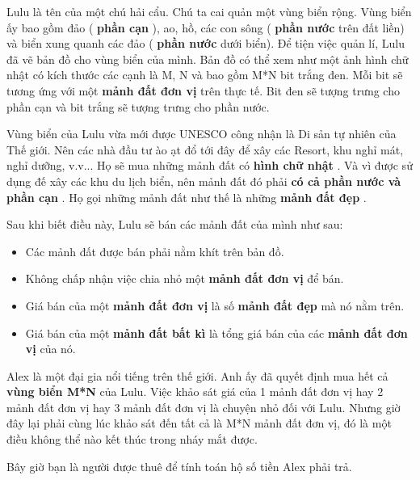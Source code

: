 



   Lulu là tên của một chú hải cẩu. Chú ta cai quản một vùng biển rộng. Vùng biển ấy bao gồm đảo (   \textbf{    phần cạn   }   ), ao, hồ, các con sông (   \textbf{    phần nước   }   trên đất liền) và biển xung quanh các đảo (   \textbf{    phần nước   }   dưới biển). Để tiện việc quản lí, Lulu đã vẽ bản đồ cho vùng biển của mình. Bản đồ có thể xem như một ảnh hình chữ nhật có kích thước các cạnh là M, N và bao gồm M*N bit trắng đen. Mỗi bit sẽ tương ứng với một   \textbf{    mảnh đất đơn vị   }   trên thực tế. Bit đen sẽ tượng trưng cho phần cạn và bit trắng sẽ tượng trưng cho phần nước.  

   Vùng biển của Lulu vừa mới được UNESCO công nhận là Di sản tự nhiên của Thế giới. Nên các nhà đầu tư ào ạt đổ tới đây để xây các Resort, khu nghỉ mát, nghỉ dưỡng, v.v... Họ sẽ mua những mảnh đất có   \textbf{    hình chữ nhật   }   . Và vì được sử dụng đế xây các khu du lịch biển, nên mảnh đất đó phải   \textbf{    có cả phần nước và phần cạn   }   . Họ gọi những mảnh đất như thế là   \textbf{}   những   \textbf{    mảnh đất đẹp   }   .  

   Sau khi biết điều này, Lulu sẽ bán các mảnh đất của mình như sau:  
\begin{itemize}
	\item     Các mảnh đất được bán phải nằm    khít    trên bản đồ.   
	\item     Không chấp nhận việc chia nhỏ một    \textbf{     mảnh đất đơn vị    }    để bán.   
	\item     Giá bán của một    \textbf{     mảnh đất đơn vị    }    là số    \textbf{     mảnh đất đẹp    }    mà nó nằm trên.   
	\item     Giá bán của một    \textbf{     mảnh đất bất kì    }    là tổng giá bán của các    \textbf{     mảnh đất đơn vị    }    của nó.   
\end{itemize}

   Alex là một đại gia nổi tiếng trên thế giới. Anh ấy đã quyết định mua hết cả   \textbf{    vùng biển M*N   }   của Lulu. Việc khảo sát giá của 1 mảnh đất đơn vị hay 2 mảnh đất đơn vị hay 3 mảnh đất đơn vị là chuyện nhỏ đối với Lulu. Nhưng giờ đây lại phải cùng lúc khảo sát đến tất cả là M*N mảnh đất đơn vị, đó là một điều không thể nào kết thúc trong nháy mắt được.  

   Bây giờ bạn là người được thuê để tính toán hộ số tiền Alex phải trả.  
\begin{itemize}
\end{itemize}

